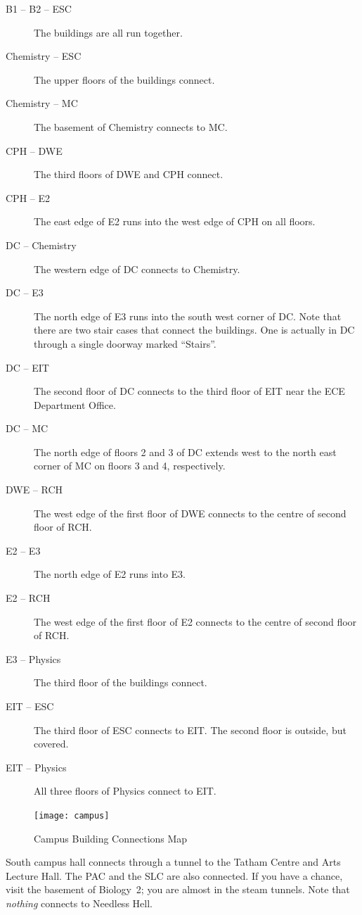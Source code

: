 \documentclass{book}
\begin{document}
\begin{description}
\item[B1 -- B2 -- ESC] The buildings are all run together.
\item[Chemistry -- ESC] The upper floors of the buildings connect.
\item[Chemistry -- MC] The basement of Chemistry connects to MC.
\item[CPH -- DWE] The third floors of DWE and CPH connect.
\item[CPH -- E2] The east edge of E2 runs into the west edge of CPH on all floors.
\item[DC -- Chemistry] The western edge of DC connects to Chemistry.
\item[DC -- E3] The north edge of E3 runs into the south west corner of DC. Note that there are two stair cases that connect the buildings. One is actually in DC through a single doorway marked ``Stairs''.
\item[DC -- EIT] The second floor of DC connects to the third floor of EIT near the ECE Department Office.
\item[DC -- MC] The north edge of floors 2 and 3 of DC extends west to the north east corner of MC on floors 3 and 4, respectively.
\item[DWE -- RCH] The west edge of the first floor of DWE connects to the centre of second floor of RCH.
\item[E2 -- E3] The north edge of E2 runs into E3.
\item[E2 -- RCH] The west edge of the first floor of E2 connects to the centre of second floor of RCH.
\item[E3 -- Physics] The third floor of the buildings connect.
\item[EIT -- ESC] The third floor of ESC connects to EIT. The second floor is outside, but covered.
\item[EIT -- Physics] All three floors of Physics connect to EIT.
\end{description}

\begin{figure}
\begin{center}
\texttt{[image: campus]}
\end{center}
\caption{\label{fig:map}Campus Building Connections Map}
\end{figure}

South campus hall connects through a tunnel to the Tatham Centre and Arts Lecture Hall. The PAC and the SLC are also connected. If you have a chance, visit the basement of Biology~2; you are almost in the steam tunnels. Note that \emph{nothing} connects to Needless Hell.
\end{document}
